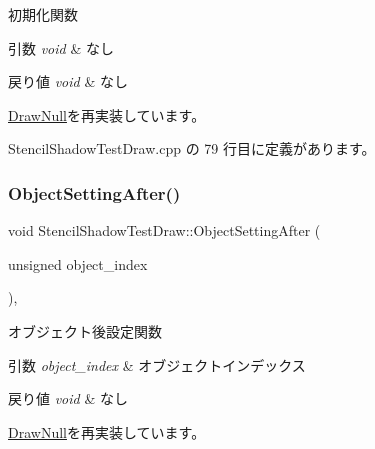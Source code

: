 初期化関数 


\begin{DoxyParams}{引数}
{\em void} & なし \\
\hline
\end{DoxyParams}

\begin{DoxyRetVals}{戻り値}
{\em void} & なし \\
\hline
\end{DoxyRetVals}


\mbox{\hyperlink{class_draw_null_a20aef1e54c1a158b741bfd731e18efdf}{Draw\+Null}}を再実装しています。



 Stencil\+Shadow\+Test\+Draw.\+cpp の 79 行目に定義があります。

\mbox{\label{class_stencil_shadow_test_draw_a11fa9d700ca8db585b6f0b0be779d1ab}} 
\subsubsection{\texorpdfstring{Object\+Setting\+After()}{ObjectSettingAfter()}}
{\footnotesize\ttfamily void Stencil\+Shadow\+Test\+Draw\+::\+Object\+Setting\+After (\begin{DoxyParamCaption}\item[{unsigned}]{object\+\_\+index }\end{DoxyParamCaption})\hspace{0.3cm}{\ttfamily [override]}, {\ttfamily [virtual]}}



オブジェクト後設定関数 


\begin{DoxyParams}{引数}
{\em object\+\_\+index} & オブジェクトインデックス \\
\hline
\end{DoxyParams}

\begin{DoxyRetVals}{戻り値}
{\em void} & なし \\
\hline
\end{DoxyRetVals}


\mbox{\hyperlink{class_draw_null_a5b4466ae238e46cffe4a10fd253caf17}{Draw\+Null}}を再実装しています。



